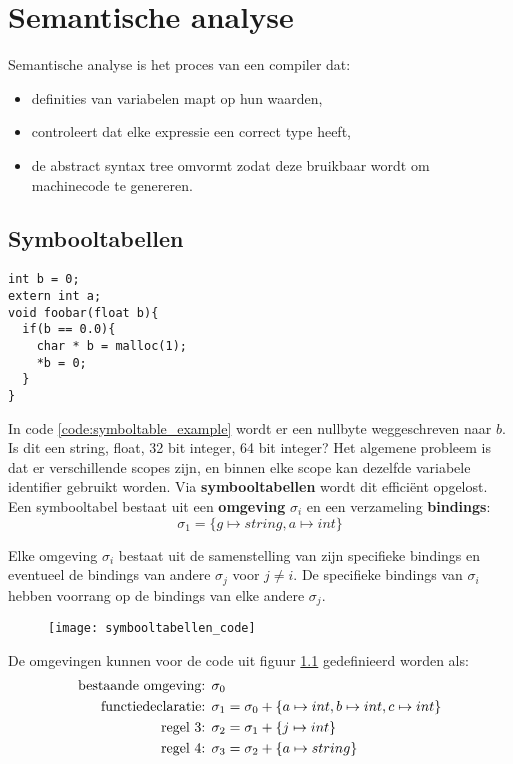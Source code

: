 \chapter{Semantische analyse}
\label{ch:semantische_analyse}

Semantische analyse is het proces van een compiler dat:
\begin{itemize}
	\item definities van variabelen mapt op hun waarden,
	\item controleert dat elke expressie een correct type heeft,
	\item de abstract syntax tree omvormt zodat deze bruikbaar wordt om machinecode te genereren.
\end{itemize}

\section{Symbooltabellen}
\begin{lstlisting}[caption={Het scopeprobleem.},captionpos=b,label={code:symboltable_example}]
int b = 0;
extern int a;
void foobar(float b){
  if(b == 0.0){
    char * b = malloc(1);
    *b = 0;
  }
}
\end{lstlisting}

In code \protect\ref{code:symboltable_example} wordt er een nullbyte weggeschreven naar $b$. Is dit een string, float, 32 bit integer, 64 bit integer? Het algemene probleem is dat er verschillende scopes zijn, en binnen elke scope kan dezelfde variabele identifier gebruikt worden. Via \textbf{symbooltabellen} wordt dit efficiënt opgelost.
Een symbooltabel bestaat uit een \textbf{omgeving} $\sigma_i$ en een verzameling \textbf{bindings}:
$$\sigma_1 = \{g \mapsto string, a \mapsto int\}$$

Elke omgeving $\sigma_i$ bestaat uit de samenstelling van zijn specifieke bindings en eventueel de bindings van andere $\sigma_{j}$ voor $j \neq i$. De specifieke bindings van $\sigma_i$ hebben voorrang op de bindings van elke andere $\sigma_{j}$.

\begin{figure}[h]
	\centering
	\texttt{[image: symbooltabellen\_code]}
	\caption{}
	\label{fig:symbooltabellen_code}
\end{figure}

De omgevingen kunnen voor de code uit figuur \ref{fig:symbooltabellen_code} gedefinieerd worden als:
\begin{equation*}
	\begin{split}
		\hbox{bestaande omgeving: } & \sigma_0 \\
		\hbox{functiedeclaratie: } & \sigma_1 = \sigma_0 + \{a \mapsto int, b \mapsto int, c \mapsto int\} \\ 
		\hbox{regel 3: } & \sigma_2 = \sigma_1 + \{j \mapsto int \} \\
		\hbox{regel 4: } & \sigma_3 = \sigma_2 + \{a \mapsto string \} \\
	\end{split}
\end{equation*}


